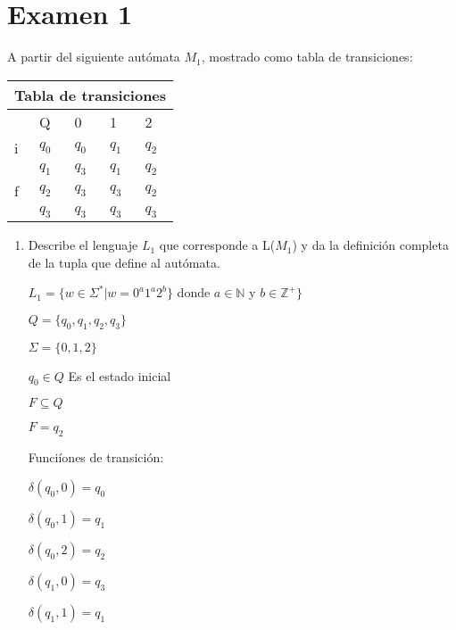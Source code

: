 \renewcommand{\labelenumi}{\alph{enumi})}

\section*{Examen 1}

\begin{questions}
\question A partir del siguiente autómata $M_{1}$, mostrado como tabla de transiciones: \\
    \begin{tabular}{|p{3cm}||p{3cm}|p{3cm}|p{3cm}|p{3cm}|}
        \hline
        \multicolumn{5}{|c|}{Tabla de transiciones} \\
        \hline
        & Q&0&1&2\\
        \hline
        i   & $q_{0}$    &$q_{0}$&   $q_{1}$ &   $q_{2}$ \\
        &   $q_{1}$  & $q_{3}$   &$q_{1}$ &   $q_{2}$\\
        f &$q_{2}$ & $q_{3}$&  $q_{3}$ &   $q_{2}$\\
        &$q_{3}$& $q_{3}$&  $q_{3}$ &   $q_{3}$\\
        \hline
   \end{tabular}
   \begin{enumerate}
        \item Describe el lenguaje $L_{1}$ que corresponde a L($M_{1}$)
        y da la definici\'on completa de la tupla que define al aut\'omata.
            \begin{solution}
                $L_{1} = \{ w \in \Sigma ^{*} | w = 0^{a}1^{a}2^{b}\}$ donde $a \in \mathbb N$ y $b \in \mathbb Z ^{+}\}$

                $Q = \{q_{0},q_{1},q_{2},q_{3}\}$

                $\Sigma = \{0,1,2\}$

                $q_{0} \in Q$ Es el estado inicial

                $F \subseteq Q$ 

                $F = {q_{2}}$ 

                Funci\'iones de transici\'on:

                $\delta (q_{0}, 0) = q_{0}$

                $\delta (q_{0}, 1) = q_{1}$

                $\delta (q_{0}, 2) = q_{2}$

                $\delta (q_{1}, 0) = q_{3}$

                $\delta (q_{1}, 1) = q_{1}$


\end{solution}
\end{enumerate}
\end{questions}

